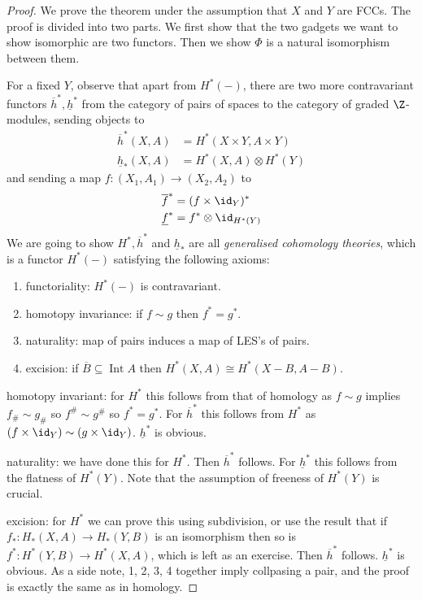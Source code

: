 \documentclass[a4paper]{article}
\DeclareMathOperator{\Int}{Int} %
\begin{document}
\begin{proof}
  We prove the theorem under the assumption that \(X\) and \(Y\) are FCCs. The proof is divided into two parts. We first show that the two gadgets we want to show isomorphic are two functors. Then we show \(\Phi\) is a natural isomorphism between them.

  For a fixed \(Y\), observe that apart from \(H^*(-)\), there are two more contravariant functors \(\overline h^*, \underline h^*\) from the category of pairs of spaces to the category of graded \(\Z\)-modules, sending objects to
  \begin{align*}
    \overline h^*(X, A) &= H^*(X \times Y, A \times Y) \\
    \underline h_*(X, A) &= H^*(X, A) \otimes H^*(Y)
  \end{align*}
  and sending a map \(f: (X_1, A_1) \to (X_2, A_2)\) to
  \begin{align*}
    \overline f^* &= (f \times \id_Y)^* \\
    \underline f^* &= f^* \otimes \id_{H^*(Y)}
  \end{align*}
  We are going to show \(H^*, \overline h^*\) and \(\underline h_*\) are all \emph{generalised cohomology theories}, which is a functor \(H^*(-)\) satisfying the following axioms:
  \begin{enumerate}
  \item functoriality: \(H^*(-)\) is contravariant.
  \item homotopy invariance: if \(f \sim g\) then \(f^* = g^*\).
  \item naturality: map of pairs induces a map of LES's of pairs.
  \item excision: if \(\overline B \subseteq \Int A\) then \(H^*(X, A) \cong H^*(X - B, A - B)\).
  \end{enumerate}

  homotopy invariant: for \(H^*\) this follows from that of homology as \(f \sim g\) implies \(f_\# \sim g_\#\) so \(f^\# \sim g^\#\) so \(f^* = g^*\). For \(\overline h^*\) this follows from \(H^*\) as \((f \times \id_Y) \sim (g \times \id_Y)\). \(\underline h^*\) is obvious.

  naturality: we have done this for \(H^*\). Then \(\overline h^*\) follows. For \(\underline h^*\) this follows from the flatness of \(H^*(Y)\). Note that the assumption of freeness of \(H^*(Y)\) is crucial.

  excision: for \(H^*\) we can prove this using subdivision, or use the result that if \(f_*: H_*(X, A) \to H_*(Y, B)\) is an isomorphism then so is \(f^*: H^*(Y, B) \to H^*(X, A)\), which is left as an exercise. Then \(\overline h^*\) follows. \(\underline h^*\) is obvious. As a side note, 1, 2, 3, 4 together imply collpasing a pair, and the proof is exactly the same as in homology.


\end{proof}
\end{document}
